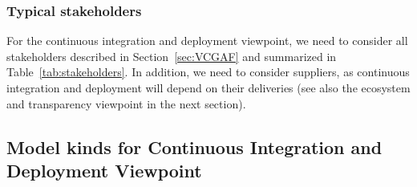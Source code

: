 
\subsubsection{Typical stakeholders} 

For the continuous integration and deployment viewpoint, we need to consider all stakeholders described in Section~\ref{sec:VCGAF} and summarized in Table~\ref{tab:stakeholders}.
In addition, we need to consider suppliers, as continuous integration and deployment will depend on their deliveries (see also the ecosystem and transparency viewpoint in the next section).

%
%
%
%
%
%
%
%
%
%

%
%



\subsection{Model kinds for Continuous Integration and Deployment Viewpoint}\label{mk:list}


